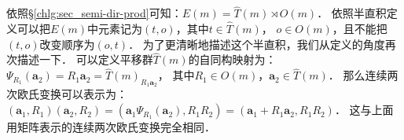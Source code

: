 依照\S\ref{chlg:sec_semi-dir-prod}可知：$E(m)= \hat{T}(m) \rtimes O(m)$．
依照半直积定义可以把$E(m)$中元素记为$(t,o)$，其中$t\in \hat{T}(m)$，
$o\in O(m)$，且不能把$(t,o)$改变顺序为$(o,t)$．
为了更清晰地描述这个半直积，我们从定义的角度再次描述一下．
可以定义平移群$\hat{T}(m)$的自同构映射为：
$\Psi_{R_1}( \boldsymbol{a}_2)=R_1 \boldsymbol{a}_2 = \hat{T}(m)_{R_1 \boldsymbol{a}_2}$，
其中$R_1 \in O(m)$，$\boldsymbol{a}_2\in \hat{T}(m)$．
那么连续两次欧氏变换可以表示为：
$(\boldsymbol{a}_1, R_1)(\boldsymbol{a}_2, R_2)=(\boldsymbol{a}_1 \Psi_{R_1}( \boldsymbol{a}_2), R_1 R_2)
=(\boldsymbol{a}_1 + R_1 \boldsymbol{a}_2 , R_1 R_2)$．
这与上面用矩阵表示的连续两次欧氏变换完全相同．





